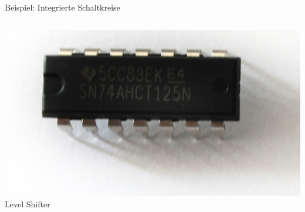 {\begin{frame}{Beispiel: Integrierte Schaltkreise}
\begin{columns}
        \includegraphics[width=.8\textwidth]{2-hardwaredesign/img/komponenten_ic_levelshifter} \\
        Level Shifter
    \end{columns}
\end{frame}
}

